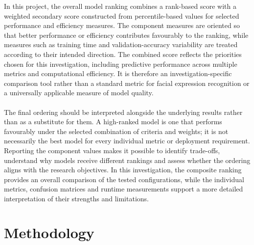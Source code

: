 \documentclass[12pt, a4paper]{report}
\begin{document}
				In this project, the overall model ranking combines a rank-based score with a weighted secondary score constructed from percentile-based values for selected performance and efficiency measures. The component measures are oriented so that better performance or efficiency contributes favourably to the ranking, while measures such as training time and validation-accuracy variability are treated according to their intended direction. The combined score reflects the priorities chosen for this investigation, including predictive performance across multiple metrics and computational efficiency. It is therefore an investigation-specific comparison tool rather than a standard metric for facial expression recognition or a universally applicable measure of model quality.\\\\
				The final ordering should be interpreted alongside the underlying results rather than as a substitute for them. A high-ranked model is one that performs favourably under the selected combination of criteria and weights; it is not necessarily the best model for every individual metric or deployment requirement. Reporting the component values makes it possible to identify trade-offs, understand why models receive different rankings and assess whether the ordering aligns with the research objectives. In this investigation, the composite ranking provides an overall comparison of the tested configurations, while the individual metrics, confusion matrices and runtime measurements support a more detailed interpretation of their strengths and limitations.
				
				
	\chapter{Methodology}
		
\end{document}
